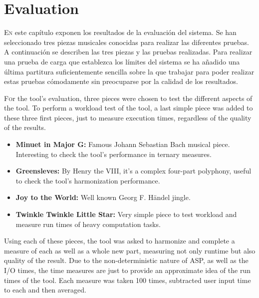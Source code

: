 \chapter{Evaluation}
\label{chap:evaluation}
\vspace{0.5cm}


 \lettrine{E}{n} este capítulo exponen los resultados de la evaluación del sistema. Se han seleccionado tres piezas musicales conocidas para realizar las diferentes pruebas. A continuación se describen las tres piezas y las pruebas realizadas. Para realizar una prueba de carga que establezca los límites del sistema se ha añadido una última partitura suficientemente sencilla sobre la que trabajar para poder realizar estas pruebas cómodamente sin preocuparse por la calidad de los resultados.
 
 \lettrine{F}or the tool's evaluation, three pieces were chosen to test the different aspects of the tool. To perform a workload test of the tool, a last simple piece was added to these three first pieces, just to measure execution times, regardless of the quality of the results.
 
 \begin{itemize}
 	\item \textbf{Minuet in Major G:} Famous Johann Sebastian Bach musical piece. Interesting to check the tool's performance in ternary measures.
 	\item \textbf{Greensleves:} By Henry the VIII, it's a complex four-part polyphony, useful to check the tool's harmonization performance.
 	\item \textbf{Joy to the World:} Well known Georg F. Händel jingle.
    \item \textbf{Twinkle Twinkle Little Star:} Very simple piece to test workload and measure run times of heavy computation tasks.
 \end{itemize}
 
Using each of these pieces, the tool was asked to harmonize and complete a measure of each as well as a whole new part, measuring not only runtime but also quality of the result. Due to the non-deterministic nature of ASP, as well as the I/O times, the time measures are just to provide an approximate idea of the run times of the tool. Each measure was taken 100 times, subtracted user input time to each and then averaged.
 
